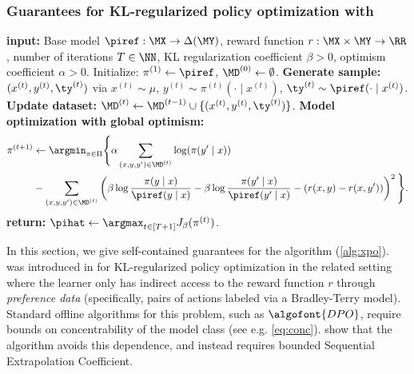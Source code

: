 \subsubsection{Guarantees for KL-regularized policy optimization with \xpo}
\label{sec:xpo_reward}

\begin{algorithm}[t]
\caption{Reward-based variant of Exploratory Preference Optimization \citep{xie2024exploratory}}\label{alg:xpo}
\begin{algorithmic}
\State \textbf{input:} Base model $\piref:\MX\to\Delta(\MY)$, reward function $r:\MX\times\MY\to\RR$, number of iterations $T \in \NN$, KL regularization coefficient $\beta>0$, optimism coefficient $\alpha>0$.
\State Initialize: $\pi^{(1)} \gets \piref$, $\MD^{(0)} \gets \emptyset$.
\State \textbf{Generate sample:} $(x^{(t)},y^{(t)}, \ty^{(t)})$ via $x^{(t)} \sim \mu$, $y^{(t)} \sim \pi^{(t)}(\cdot\mid x^{(t)})$, $\ty^{(t)} \sim \piref(\cdot\mid x^{(t)})$.
\State \textbf{Update dataset:} $\MD^{(t)} \gets \MD^{(t-1)} \cup \{(x^{(t)},y^{(t)},\ty^{(t)})\}$.
\State \textbf{Model optimization with global optimism:} 
\begin{align}
\pi^{(t+1)} &\gets \argmin_{\pi\in\Pi} \Bigg\{\alpha\sum_{(x,y,y') \in \MD^{(t)}} \log(\pi(y'\mid x)) \\
&- \sum_{(x,y,y') \in \MD^{(t)}} \left(\beta \log\frac{\pi(y\mid x)}{\piref(y\mid x)} - \beta \log\frac{\pi(y'\mid x)}{\piref(y'\mid x)} - (r(x,y) - r(x,y'))\right)^2\Bigg\}.
\end{align}
\EndFor
\State \textbf{return:} $\pihat \gets \argmax_{t \in [T+1]} J_\beta(\pi^{(t)})$. 
\end{algorithmic}
\end{algorithm}

In this section, we give self-contained guarantees for the \xpo
algorithm (\cref{alg:xpo}). \xpo was introduced in
\cite{xie2024exploratory} for KL-regularized policy optimization in
the related setting where the learner only has indirect access to the
reward function $r$ through \emph{preference data} (specifically,
pairs of actions labeled via a Bradley-Terry model). Standard offline
algorithms for this problem, such as $\algofont{DPO}$, require bounds
on concentrability of the model class (see
e.g. \cref{eq:conc}). \iftoggle{workshop}{\cite{xie2024exploratory}}{\citet{xie2024exploratory}} show that the \xpo algorithm avoids this dependence, and instead requires bounded Sequential Extrapolation Coefficient. 

